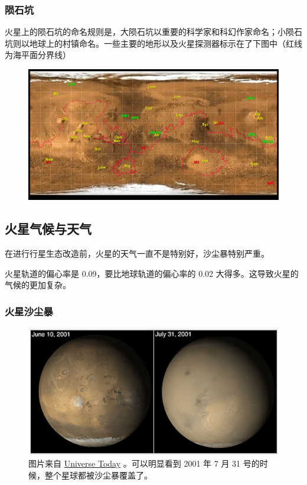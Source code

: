 \documentclass[letterpaper,10pt]{sphinxmanual}
\begin{document}
\subsubsection{陨石坑}
\label{mars:id11}
火星上的陨石坑的命名规则是，大陨石坑以重要的科学家和科幻作家命名；小陨石坑则以地球上的村镇命名。一些主要的地形以及火星探测器标示在了下图中（红线为海平面分界线）
\begin{figure}[htbp]
\centering

\includegraphics{Mars24_1.png}
\end{figure}


\subsection{火星气候与天气}
\label{mars:id12}
在进行行星生态改造前，火星的天气一直不是特别好，沙尘暴特别严重。

火星轨道的偏心率是 0.09，要比地球轨道的偏心率的 0.02 大得多。这导致火星的气候的更加复杂。


\subsubsection{火星沙尘暴}
\label{mars:id13}\begin{figure}[htbp]
\centering
\capstart

\includegraphics{duststorms.jpg}
\caption{图片来自 \href{http://www.universetoday.com/14892/mars-dust-storms}{Universe Today} 。可以明显看到 2001 年 7 月 31 号的时候，整个星球都被沙尘暴覆盖了。}\end{figure}
\begin{figure}[htbp]
\centering
\end{figure}
\end{document}
